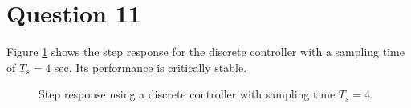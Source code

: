 \section{Question 11}

Figure \ref{fig:Q11} shows the step response for the discrete controller with a
sampling time of $T_s=4$ sec. Its performance is critically stable.

\begin{figure}[H]\centering
	\centering
	\scalebox{1}{}
  \caption{Step response using a discrete controller with sampling time $T_s = 4$.}
  \label{fig:Q11}
\end{figure}
